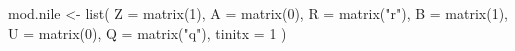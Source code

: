 \begin{Schunk}
\begin{Sinput}
 mod.nile <- list(
   Z = matrix(1), A = matrix(0), R = matrix("r"),
   B = matrix(1), U = matrix(0), Q = matrix("q"),
   tinitx = 1
 )
\end{Sinput}
\end{Schunk}
